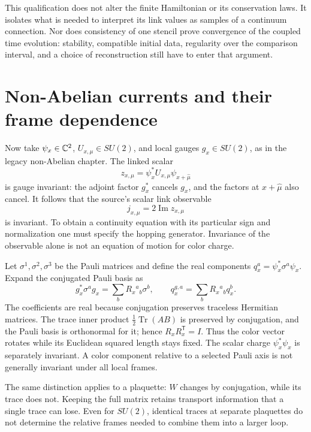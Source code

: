 This qualification does not alter the finite Hamiltonian or its conservation laws. It isolates what is needed to interpret its link values as samples of a continuum connection. Nor does consistency of one stencil prove convergence of the coupled time evolution: stability, compatible initial data, regularity over the comparison interval, and a choice of reconstruction still have to enter that argument.



\section{Non-Abelian currents and their frame dependence}\label{g:color}

Now take $\psi_x\in\mathbb C^2$, $U_{x,\mu}\in SU(2)$, and local gauges $g_x\in SU(2)$, as in the legacy non-Abelian chapter. The linked scalar
\begin{equation}\label{g:linked-scalar}
 z_{x,\mu}=\psi_x^*U_{x,\mu}\psi_{x+\widehat\mu}
\end{equation}
is gauge invariant: the adjoint factor $g_x^*$ cancels $g_x$, and the factors at $x+\widehat\mu$ also cancel. It follows that the source's scalar link observable
\begin{equation}\label{g:su2-current}
 j_{x,\mu}=2\operatorname{Im}z_{x,\mu}
\end{equation}
is invariant. To obtain a continuity equation with its particular sign and normalization one must specify the hopping generator. Invariance of the observable alone is not an equation of motion for color charge.

Let $\sigma^1,\sigma^2,\sigma^3$ be the Pauli matrices and define the real components $q_x^a=\psi_x^*\sigma^a\psi_x$. Expand the conjugated Pauli basis as
\begin{equation}\label{g:adjoint-color}
 g_x^*\sigma^a g_x=\sum_b R_x{}^a{}_b\sigma^b,
 \qquad q_x^{g,a}=\sum_bR_x{}^a{}_bq_x^b.
\end{equation}
The coefficients are real because conjugation preserves traceless Hermitian matrices. The trace inner product $\tfrac12\operatorname{Tr}(AB)$ is preserved by conjugation, and the Pauli basis is orthonormal for it; hence $R_xR_x^{\mathsf T}=I$. Thus the color vector rotates while its Euclidean squared length stays fixed. The scalar charge $\psi_x^*\psi_x$ is separately invariant. A color component relative to a selected Pauli axis is not generally invariant under all local frames.

The same distinction applies to a plaquette: $W$ changes by conjugation, while its trace does not. Keeping the full matrix retains transport information that a single trace can lose. Even for $SU(2)$, identical traces at separate plaquettes do not determine the relative frames needed to combine them into a larger loop.


